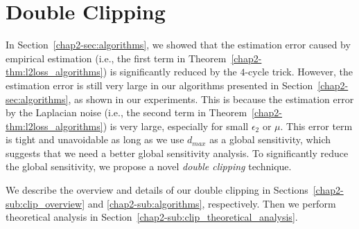 \section{Double Clipping}
\label{chap2-sec:double_clip}

In Section~\ref{chap2-sec:algorithms}, 
we showed that the estimation error caused by empirical estimation (i.e., the first term in Theorem~\ref{chap2-thm:l2loss_algorithms}) is significantly reduced by the $4$-cycle trick. 
However, 
the estimation error is 
still very large in our algorithms presented in Section~\ref{chap2-sec:algorithms}, as shown in our experiments. 
This is because 
the estimation error by the Laplacian noise (i.e., the second term in Theorem~\ref{chap2-thm:l2loss_algorithms}) 
is very large, especially for small $\epsilon_2$ or 
$\mu$. 
This error term is tight and unavoidable as long as we use $d_{max}$ as a global sensitivity, which suggests that we need a better global sensitivity analysis.
% 
To significantly reduce the global sensitivity, we propose a novel \textit{double clipping} technique. 

We describe the overview and details of our double clipping in Sections~\ref{chap2-sub:clip_overview} and \ref{chap2-sub:algorithms}, respectively. 
Then we perform theoretical analysis in Section~\ref{chap2-sub:clip_theoretical_analysis}.

